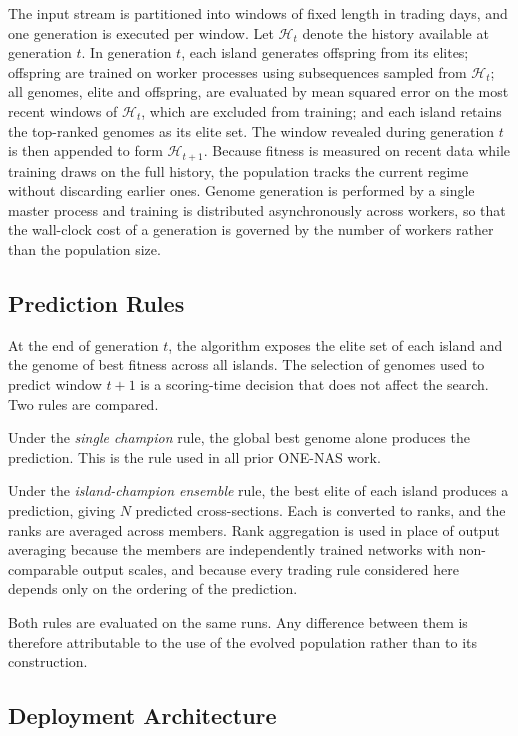 The input stream is partitioned into windows of fixed length in trading
days, and one generation is executed per window. Let $\mathcal{H}_t$
denote the history available at generation $t$. In generation $t$, each
island generates offspring from its elites; offspring are trained on
worker processes using subsequences sampled from $\mathcal{H}_t$; all
genomes, elite and offspring, are evaluated by mean squared error on
the most recent windows of $\mathcal{H}_t$, which are excluded from
training; and each island retains the top-ranked genomes as its elite
set. The window revealed during generation $t$ is then appended to form
$\mathcal{H}_{t+1}$. Because fitness is measured on recent data while
training draws on the full history, the population tracks the current
regime without discarding earlier ones. Genome generation is performed
by a single master process and training is distributed asynchronously
across workers, so that the wall-clock cost of a generation is governed
by the number of workers rather than the population size.

\subsection{Prediction Rules}
\label{sec:prediction_rules}

At the end of generation $t$, the algorithm exposes the elite set of
each island and the genome of best fitness across all islands. The
selection of genomes used to predict window $t{+}1$ is a scoring-time
decision that does not affect the search. Two rules are compared.

Under the \emph{single champion} rule, the global best genome alone
produces the prediction. This is the rule used in all prior ONE-NAS
work.

Under the \emph{island-champion ensemble} rule, the best elite of each
island produces a prediction, giving $N$ predicted cross-sections. Each
is converted to ranks, and the ranks are averaged across members. Rank
aggregation is used in place of output averaging because the members
are independently trained networks with non-comparable output scales,
and because every trading rule considered here depends only on the
ordering of the prediction.

Both rules are evaluated on the same runs. Any difference between them
is therefore attributable to the use of the evolved population rather
than to its construction.

\subsection{Deployment Architecture}
\label{sec:deployment}

